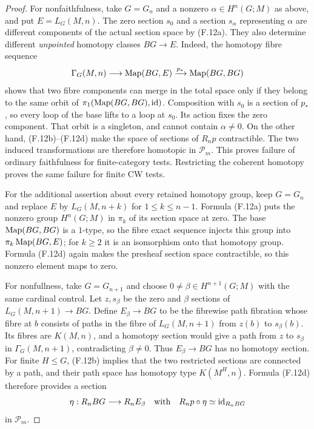 \begin{proof}
For nonfaithfulness, take $G=G_n$ and a nonzero
$\alpha\in H^n(G;M)$ as above, and put $E=L_G(M,n)$.
The zero section $s_0$ and a section $s_\alpha$ representing
$\alpha$ are different components of the actual section space
by (F.12a). They also determine different \emph{unpointed} homotopy
classes $BG\to E$. Indeed, the homotopy fibre sequence
\[
 \Gamma_G(M,n)\longrightarrow\operatorname{Map}(BG,E)
       \xrightarrow{p_*}\operatorname{Map}(BG,BG)
\]
shows that two fibre components can merge in the total space
only if they belong to the same orbit of
$\pi_1(\operatorname{Map}(BG,BG),\mathrm{id})$. Composition with $s_0$ is a section
of $p_*$, so every loop of the base lifts to a loop at $s_0$.
Its action fixes the zero component. That orbit is a singleton,
and cannot contain $\alpha\ne0$.
On the other hand, (F.12b)--(F.12d) make the space of sections
of $R_np$ contractible. The two induced transformations are
therefore homotopic in $\mathcal P_m$. This proves failure of
ordinary faithfulness for finite-category tests. Restricting
the coherent homotopy proves the same failure for finite CW
tests.

For the additional assertion about every retained homotopy group,
keep $G=G_n$ and replace $E$ by $L_G(M,n+k)$ for
$1\leq k\leq n-1$. Formula (F.12a) puts the nonzero group
$H^n(G;M)$ in $\pi_k$ of its section space at zero.
The base $\operatorname{Map}(BG,BG)$ is a $1$-type, so the fibre exact
sequence injects this group into $\pi_k\operatorname{Map}(BG,E)$; for
$k\geq2$ it is an isomorphism onto that homotopy group.
Formula (F.12d) again makes the presheaf section space
contractible, so this nonzero element maps to zero.

For nonfullness, take $G=G_{n+1}$ and choose
$0\ne\beta\in H^{n+1}(G;M)$ with the same cardinal control.
Let $z,s_\beta$ be the zero and $\beta$ sections of
$L_G(M,n+1)\to BG$. Define $E_\beta\to BG$ to be the
fibrewise path fibration whose fibre at $b$ consists of paths
in the fibre of $L_G(M,n+1)$ from $z(b)$ to $s_\beta(b)$.
Its fibres are $K(M,n)$, and a homotopy section would give a
path from $z$ to $s_\beta$ in $\Gamma_G(M,n+1)$, contradicting
$\beta\ne0$. Thus $E_\beta\to BG$ has no homotopy section.
For finite $H\leq G$, (F.12b) implies that the two restricted
sections are connected by a path, and their path space has
homotopy type $K(M^H,n)$. Formula (F.12d) therefore provides
a section
\[
 \eta:R_nBG\longrightarrow R_nE_\beta
 \quad\text{with}\quad R_np\circ\eta\simeq\mathrm{id}_{R_nBG}
\]
in $\mathcal P_m$.


\end{proof}
